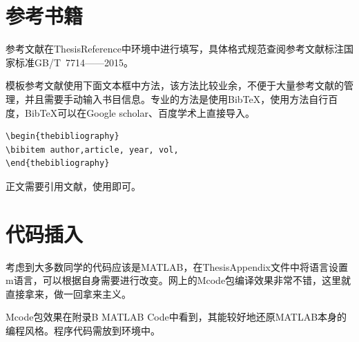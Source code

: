 {\begin{spacing}{1.5}
\section{参考书籍}
参考文献在ThesisReference中环境中进行填写，具体格式规范查阅参考文献标注国家标准GB/T~7714——2015。

模板参考文献使用下面文本框中方法，该方法比较业余，不便于大量参考文献的管理，并且需要手动输入书目信息。专业的方法是使用BibTeX，使用方法自行百度，BibTeX可以在Google scholar、百度学术上直接导入。
\begin{lstlisting}
\begin{thebibliography}
\bibitem author,article, year, vol,
\end{thebibliography}
\end{lstlisting}

正文需要引用文献，使用即可。

\section{代码插入}
考虑到大多数同学的代码应该是MATLAB，在ThesisAppendix文件中将语言设置m语言，可以根据自身需要进行改变。网上的Mcode包编译效果非常不错，这里就直接拿来，做一回拿来主义。

Mcode包效果在附录B MATLAB Code中看到，其能较好地还原MATLAB本身的编程风格。程序代码需放到环境中。

\end{spacing}
}